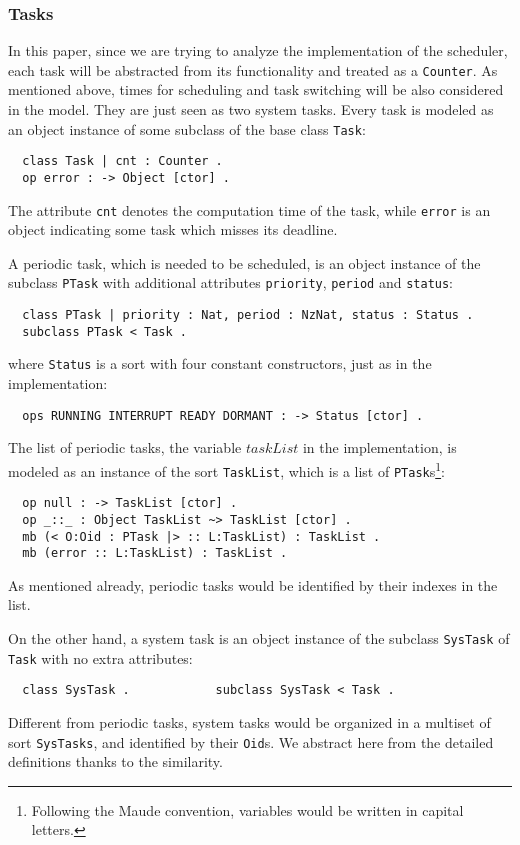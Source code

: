 \documentclass{llncs}
\begin{document}
\subsubsection{Tasks}
In this paper, since we are trying to analyze the implementation of
the scheduler, each task will be abstracted from its functionality and
treated as a \verb|Counter|. As mentioned above, times for scheduling
and task switching will be also considered in the model. They are just
seen as two system tasks. Every task is modeled as an object instance
of some subclass of the base class \verb|Task|:
\begin{verbatim}
  class Task | cnt : Counter .
  op error : -> Object [ctor] .
\end{verbatim}
The attribute \verb|cnt| denotes the computation time of the task,
while \verb|error| is an object indicating some task which misses its
deadline.

A periodic task, which is needed to be scheduled, is an object
instance of the subclass \verb|PTask| with additional attributes
\verb|priority|, \verb|period| and \verb|status|:
\begin{verbatim}
  class PTask | priority : Nat, period : NzNat, status : Status .
  subclass PTask < Task .
\end{verbatim}
where \verb|Status| is a sort with four constant constructors, just as
in the implementation:
\begin{verbatim}
  ops RUNNING INTERRUPT READY DORMANT : -> Status [ctor] .
\end{verbatim}
The list of periodic tasks, the variable $taskList$ in the
implementation, is modeled as an instance of the sort \verb|TaskList|,
which is a list of \verb|PTask|s\footnote{Following the Maude
  convention, variables would be written in capital letters.}:
\begin{verbatim}
  op null : -> TaskList [ctor] .
  op _::_ : Object TaskList ~> TaskList [ctor] .
  mb (< O:Oid : PTask |> :: L:TaskList) : TaskList .
  mb (error :: L:TaskList) : TaskList .
\end{verbatim}
As mentioned already, periodic tasks would be identified by their
indexes in the list.

On the other hand, a system task is an object instance of the subclass
\verb|SysTask| of \verb|Task| with no extra attributes:
\begin{verbatim}
  class SysTask .            subclass SysTask < Task .
\end{verbatim}
Different from periodic tasks, system tasks would be organized in a
multiset of sort \verb|SysTasks|, and identified by their \verb|Oid|s.
We abstract here from the detailed definitions thanks to the
similarity.
\end{document}
